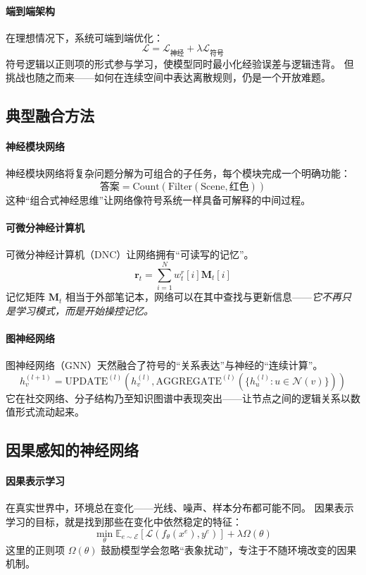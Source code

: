 \paragraph{端到端架构}
在理想情况下，系统可端到端优化：  
$$\mathcal{L} = \mathcal{L}_{\text{神经}} + \lambda \mathcal{L}_{\text{符号}}$$
符号逻辑以正则项的形式参与学习，使模型同时最小化经验误差与逻辑违背。  
但挑战也随之而来——如何在连续空间中表达离散规则，仍是一个开放难题。

\subsection{典型融合方法}

\paragraph{神经模块网络}
神经模块网络将复杂问题分解为可组合的子任务，每个模块完成一个明确功能：  
$$\text{答案} = \text{Count}(\text{Filter}(\text{Scene}, \text{红色}))$$
这种“组合式神经思维”让网络像符号系统一样具备可解释的中间过程。

\paragraph{可微分神经计算机}
可微分神经计算机（DNC）让网络拥有“可读写的记忆”。  
$$\mathbf{r}_t = \sum_{i=1}^{N} w_t^r[i] \mathbf{M}_t[i]$$
记忆矩阵 $\mathbf{M}_t$ 相当于外部笔记本，网络可以在其中查找与更新信息——\emph{它不再只是学习模式，而是开始操控记忆。}

\paragraph{图神经网络}
图神经网络（GNN）天然融合了符号的“关系表达”与神经的“连续计算”。  
$$h_v^{(l+1)} = \text{UPDATE}^{(l)}\left(h_v^{(l)}, \text{AGGREGATE}^{(l)}\left(\{h_u^{(l)} : u \in \mathcal{N}(v)\}\right)\right)$$
它在社交网络、分子结构乃至知识图谱中表现突出——让节点之间的逻辑关系以数值形式流动起来。

\subsection{因果感知的神经网络}

\paragraph{因果表示学习}
在真实世界中，环境总在变化——光线、噪声、样本分布都可能不同。  
因果表示学习的目标，就是找到那些在变化中依然稳定的特征：  
$$\min_{\theta} \mathbb{E}_{e \sim \mathcal{E}} \left[ \mathcal{L}(f_\theta(x^e), y^e) \right] + \lambda \Omega(\theta)$$
这里的正则项 $\Omega(\theta)$ 鼓励模型学会忽略“表象扰动”，专注于不随环境改变的因果机制。

